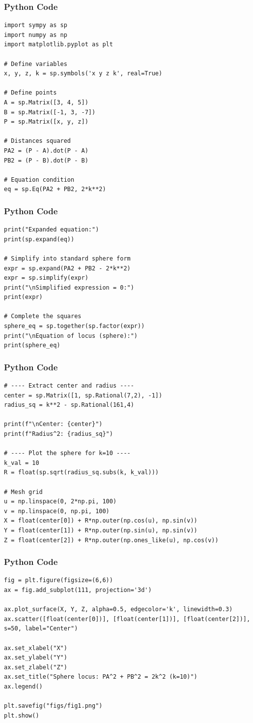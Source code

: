 \documentclass{beamer}
\begin{document}
\begin{frame}[fragile]
    \frametitle{Python Code}
\begin{lstlisting}
import sympy as sp
import numpy as np
import matplotlib.pyplot as plt

# Define variables
x, y, z, k = sp.symbols('x y z k', real=True)

# Define points
A = sp.Matrix([3, 4, 5])
B = sp.Matrix([-1, 3, -7])
P = sp.Matrix([x, y, z])

# Distances squared
PA2 = (P - A).dot(P - A)
PB2 = (P - B).dot(P - B)

# Equation condition
eq = sp.Eq(PA2 + PB2, 2*k**2)
\end{lstlisting}
\end{frame}

\begin{frame}[fragile]
    \frametitle{Python Code}
\begin{lstlisting}
print("Expanded equation:")
print(sp.expand(eq))

# Simplify into standard sphere form
expr = sp.expand(PA2 + PB2 - 2*k**2)
expr = sp.simplify(expr)
print("\nSimplified expression = 0:")
print(expr)

# Complete the squares
sphere_eq = sp.together(sp.factor(expr))
print("\nEquation of locus (sphere):")
print(sphere_eq)
\end{lstlisting}
\end{frame}

\begin{frame}[fragile]
    \frametitle{Python Code}
\begin{lstlisting}
# ---- Extract center and radius ----
center = sp.Matrix([1, sp.Rational(7,2), -1])
radius_sq = k**2 - sp.Rational(161,4)

print(f"\nCenter: {center}")
print(f"Radius^2: {radius_sq}")

# ---- Plot the sphere for k=10 ----
k_val = 10
R = float(sp.sqrt(radius_sq.subs(k, k_val)))

# Mesh grid
u = np.linspace(0, 2*np.pi, 100)
v = np.linspace(0, np.pi, 100)
X = float(center[0]) + R*np.outer(np.cos(u), np.sin(v))
Y = float(center[1]) + R*np.outer(np.sin(u), np.sin(v))
Z = float(center[2]) + R*np.outer(np.ones_like(u), np.cos(v))
\end{lstlisting}
\end{frame}

\begin{frame}[fragile]
    \frametitle{Python Code}
\begin{lstlisting}
fig = plt.figure(figsize=(6,6))
ax = fig.add_subplot(111, projection='3d')

ax.plot_surface(X, Y, Z, alpha=0.5, edgecolor='k', linewidth=0.3)
ax.scatter([float(center[0])], [float(center[1])], [float(center[2])], s=50, label="Center")

ax.set_xlabel("X")
ax.set_ylabel("Y")
ax.set_zlabel("Z")
ax.set_title("Sphere locus: PA^2 + PB^2 = 2k^2 (k=10)")
ax.legend()

plt.savefig("figs/fig1.png")
plt.show()
\end{lstlisting}
\end{frame}
\end{document}
